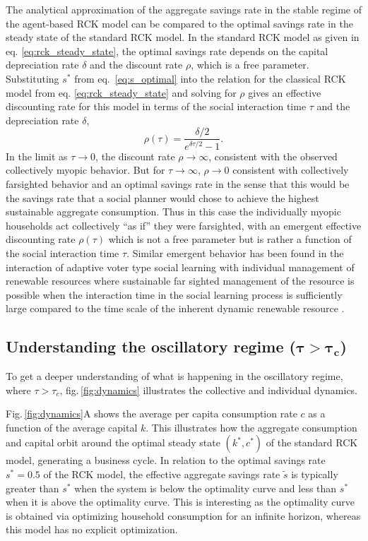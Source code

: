 The analytical approximation of the aggregate savings rate in the stable regime of the agent-based RCK model can be compared to the optimal savings rate in the steady state of the standard RCK model. In the standard RCK model as given in eq. \ref{eq:rck_steady_state}, the optimal savings rate depends on the capital depreciation rate $\delta$ and the discount rate $\rho$, which is a free parameter. Substituting $s^\ast$ from eq.~\eqref{eq:s_optimal} into the relation for the classical RCK model from eq. \eqref{eq:rck_steady_state} and solving for $\rho$ gives an effective discounting rate for this model in terms of the social interaction time $\tau$ and the depreciation rate $\delta$,
\begin{equation}
   \rho(\tau) = \frac{\delta/2}{e^{\delta \tau/2} - 1}. \label{eq:rhotau}
\end{equation}
In the limit as $\tau \to 0$, the discount rate $\rho \to \infty$, consistent with the observed collectively myopic behavior. But for $\tau \to \infty$, $\rho \to 0$ consistent with collectively farsighted behavior and an optimal savings rate in the sense that this would be the savings rate that a social planner would chose to achieve the highest sustainable aggregate consumption. Thus in this case the individually myopic households act collectively ``as if'' they were farsighted, with an emergent effective discounting rate $\rho(\tau)$ which is not a free parameter but is rather a function of the social interaction time $\tau$. Similar emergent behavior has been found in the interaction of adaptive voter type social learning with individual management of renewable resources where sustainable far sighted management of the resource is possible when the interaction time in the social learning process is sufficiently large compared to the time scale of the inherent dynamic renewable resource \citep{Wiedermann2015}. 


\subsection{Understanding the oscillatory regime ($\mathbf{\tau \!>\! \tau_{c} }$)}
\label{sec:savings_oscillations}
To get a deeper understanding of what is happening in the oscillatory regime, where $\tau > \tau_{c}$, fig.\,\ref{fig:dynamics} illustrates the collective and individual dynamics.

Fig.\,\ref{fig:dynamics}A shows the average per capita consumption rate $c$ as a function of the average capital $k$. 
This illustrates how the aggregate consumption and capital orbit around the optimal steady state $(k^\ast,c^\ast)$  of the standard RCK model, generating a business cycle.  
In relation to the optimal savings rate $s^\ast \!=\!0.5$ of the RCK model, the effective aggregate savings rate $\tilde{s}$ is typically greater than $s^\ast$ when the system is below the optimality curve and less than $ s^\ast$ when it is above the optimality curve. 
This is interesting as the optimality curve is obtained via optimizing household consumption for an infinite horizon, whereas this model has no explicit optimization.  

